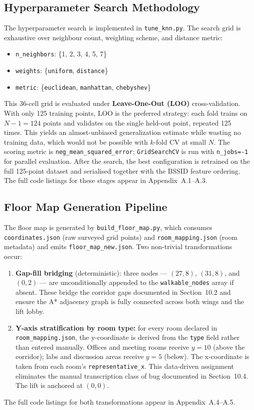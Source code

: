 \documentclass[11pt,a4paper]{article}
\begin{document}
\subsection{Hyperparameter Search Methodology}
The hyperparameter search is implemented in \texttt{tune\_knn.py}. The search grid is exhaustive over neighbour count, weighting scheme, and distance metric:
\begin{itemize}
\item \texttt{n\_neighbors}: \{1, 2, 3, 4, 5, 7\}
\item \texttt{weights}: \{\texttt{uniform}, \texttt{distance}\}
\item \texttt{metric}: \{\texttt{euclidean}, \texttt{manhattan}, \texttt{chebyshev}\}
\end{itemize}
This 36-cell grid is evaluated under \textbf{Leave-One-Out (LOO)} cross-validation. With only 125 training points, LOO is the preferred strategy: each fold trains on $N-1 = 124$ points and validates on the single held-out point, repeated 125 times. This yields an almost-unbiased generalization estimate while wasting no training data, which would not be possible with $k$-fold CV at small $N$. The scoring metric is \texttt{neg\_mean\_squared\_error}; \texttt{GridSearchCV} is run with \texttt{n\_jobs=-1} for parallel evaluation. After the search, the best configuration is retrained on the full 125-point dataset and serialised together with the BSSID feature ordering. The full code listings for these stages appear in Appendix~A.1--A.3.
\subsection{Floor Map Generation Pipeline}
The floor map is generated by \texttt{build\_floor\_map.py}, which consumes \texttt{coordinates.json} (raw surveyed grid points) and \texttt{room\_mapping.json} (room metadata) and emits \texttt{floor\_map\_new.json}. Two non-trivial transformations occur:
\begin{enumerate}
\item \textbf{Gap-fill bridging} (deterministic): three nodes --- $(27, 8)$, $(31, 8)$, and $(0, 2)$ --- are unconditionally appended to the \texttt{walkable\_nodes} array if absent. These bridge the corridor gaps documented in Section~10.2 and ensure the A* adjacency graph is fully connected across both wings and the lift lobby.
\item \textbf{Y-axis stratification by room type:} for every room declared in \texttt{room\_mapping.json}, the y-coordinate is derived from the \texttt{type} field rather than entered manually. Offices and meeting rooms receive $y = 10$ (above the corridor); labs and discussion areas receive $y = 5$ (below). The x-coordinate is taken from each room's \texttt{representative\_x}. This data-driven assignment eliminates the manual transcription class of bug documented in Section~10.4. The lift is anchored at $(0, 0)$.
\end{enumerate}
The full code listings for both transformations appear in Appendix~A.4--A.5.
\end{document}
